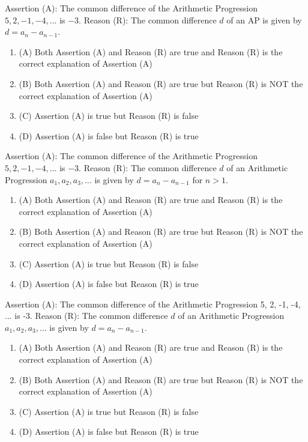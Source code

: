 \documentclass[12pt,a4paper]{exam}
\begin{document}
\begin{questions}
\question[1] Assertion (A): The common difference of the Arithmetic Progression $5, 2, -1, -4, ...$ is $-3$. Reason (R): The common difference $d$ of an AP is given by $d = a_{n} - a_{n-1}$.
\begin{enumerate}[label=(\Alph*)]
  \item (A) Both Assertion (A) and Reason (R) are true and Reason (R) is the correct explanation of Assertion (A)
  \item (B) Both Assertion (A) and Reason (R) are true but Reason (R) is NOT the correct explanation of Assertion (A)
  \item (C) Assertion (A) is true but Reason (R) is false
  \item (D) Assertion (A) is false but Reason (R) is true
\end{enumerate}
\vspace{0.15cm}

\question[1] Assertion (A): The common difference of the Arithmetic Progression $5, 2, -1, -4, \dots$ is $-3$. Reason (R): The common difference $d$ of an Arithmetic Progression $a_1, a_2, a_3, \dots$ is given by $d = a_n - a_{n-1}$ for $n > 1$.
\begin{enumerate}[label=(\Alph*)]
  \item (A) Both Assertion (A) and Reason (R) are true and Reason (R) is the correct explanation of Assertion (A)
  \item (B) Both Assertion (A) and Reason (R) are true but Reason (R) is NOT the correct explanation of Assertion (A)
  \item (C) Assertion (A) is true but Reason (R) is false
  \item (D) Assertion (A) is false but Reason (R) is true
\end{enumerate}
\vspace{0.15cm}

\question[1] Assertion (A): The common difference of the Arithmetic Progression 5, 2, -1, -4, ... is -3. Reason (R): The common difference $d$ of an Arithmetic Progression $a_1, a_2, a_3, ...$ is given by $d = a_{n} - a_{n-1}$.
\begin{enumerate}[label=(\Alph*)]
  \item (A) Both Assertion (A) and Reason (R) are true and Reason (R) is the correct explanation of Assertion (A)
  \item (B) Both Assertion (A) and Reason (R) are true but Reason (R) is NOT the correct explanation of Assertion (A)
  \item (C) Assertion (A) is true but Reason (R) is false
  \item (D) Assertion (A) is false but Reason (R) is true
\end{enumerate}
\vspace{0.15cm}


\end{questions}
\end{document}
